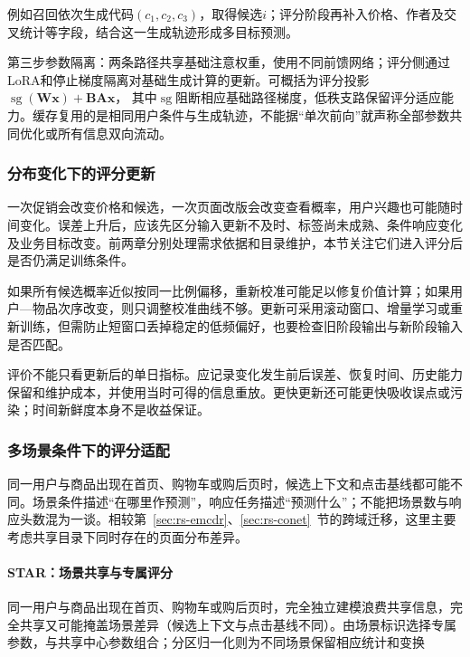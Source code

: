 例如召回依次生成代码$(c_1,c_2,c_3)$，取得候选$i$；评分阶段再补入价格、作者及交叉统计等字段，结合这一生成轨迹形成多目标预测。

第三步参数隔离：两条路径共享基础注意权重，使用不同前馈网络；评分侧通过LoRA和停止梯度隔离对基础生成计算的更新。可概括为评分投影
$\operatorname{sg}(\bm W\bm x)+\bm B\bm A\bm x$，
其中$\operatorname{sg}$阻断相应基础路径梯度，低秩支路保留评分适应能力。缓存复用的是相同用户条件与生成轨迹，不能据“单次前向”就声称全部参数共同优化或所有信息双向流动。

\subsubsection{分布变化下的评分更新}
\label{sec:rs-score-drift}

一次促销会改变价格和候选，一次页面改版会改变查看概率，用户兴趣也可能随时间变化。误差上升后，应该先区分输入更新不及时、标签尚未成熟、条件响应变化及业务目标改变。前两章分别处理需求依据和目录维护，本节关注它们进入评分后是否仍满足训练条件。

如果所有候选概率近似按同一比例偏移，重新校准可能足以修复价值计算；如果用户—物品次序改变，则只调整校准曲线不够。更新可采用滚动窗口、增量学习或重新训练，但需防止短窗口丢掉稳定的低频偏好，也要检查旧阶段输出与新阶段输入是否匹配。

评价不能只看更新后的单日指标。应记录变化发生前后误差、恢复时间、历史能力保留和维护成本，并使用当时可得的信息重放。更快更新还可能更快吸收误点或污染；时间新鲜度本身不是收益保证。

\subsubsection{多场景条件下的评分适配}
\label{sec:rs-multiscenario}

同一用户与商品出现在首页、购物车或购后页时，候选上下文和点击基线都可能不同。场景条件描述“在哪里作预测”，响应任务描述“预测什么”；不能把场景数与响应头数混为一谈。相较第~\ref{sec:rs-emcdr}、\ref{sec:rs-conet}~节的跨域迁移，这里主要考虑共享目录下同时存在的页面分布差异。

\paragraph{STAR：场景共享与专属评分}
\label{sec:rs-star}

同一用户与商品出现在首页、购物车或购后页时，完全独立建模浪费共享信息，完全共享又可能掩盖场景差异（候选上下文与点击基线不同）。由场景标识选择专属参数，与共享中心参数组合；分区归一化则为不同场景保留相应统计和变换


